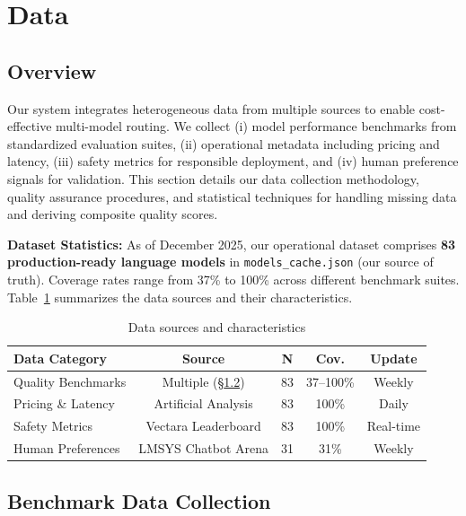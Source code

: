 \section{Data}
\label{sec:data}

\subsection{Overview}

Our system integrates heterogeneous data from multiple sources to enable cost-effective multi-model routing. We collect (i) model performance benchmarks from standardized evaluation suites, (ii) operational metadata including pricing and latency, (iii) safety metrics for responsible deployment, and (iv) human preference signals for validation. This section details our data collection methodology, quality assurance procedures, and statistical techniques for handling missing data and deriving composite quality scores.

\textbf{Dataset Statistics:} As of December 2025, our operational dataset comprises \textbf{83 production-ready language models} in \texttt{models\_cache.json} (our source of truth). Coverage rates range from 37\% to 100\% across different benchmark suites. Table~\ref{tab:data-sources} summarizes the data sources and their characteristics.

\begin{table}[t]
\centering
\caption{Data sources and characteristics}
\label{tab:data-sources}
\small
\begin{tabular}{lcccc}
\toprule
\textbf{Data Category} & \textbf{Source} & \textbf{N} & \textbf{Cov.} & \textbf{Update} \\
\midrule
Quality Benchmarks & Multiple (§\ref{sec:benchmarks}) & 83 & 37--100\% & Weekly \\
Pricing \& Latency & Artificial Analysis & 83 & 100\% & Daily \\
Safety Metrics & Vectara Leaderboard & 83 & 100\% & Real-time \\
Human Preferences & LMSYS Chatbot Arena & 31 & 31\% & Weekly \\
\bottomrule
\end{tabular}
\end{table}

\subsection{Benchmark Data Collection}
\label{sec:benchmarks}

